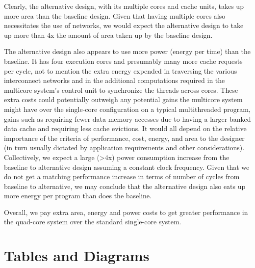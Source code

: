 \documentclass[10pt]{article}
\begin{document}
Clearly, the alternative design, with its multiple cores and cache units, takes up more area than the baseline design. Given that having multiple cores also necessitates the use of networks, we would expect the alternative design to take up more than 4x the amount of area taken up by the baseline design.

The alternative design also appears to use more power (energy per time) than the baseline. It has four execution cores and presumably many more cache requests per cycle, not to mention the extra energy expended in traversing the various interconnect networks and in the additional computations required in the multicore system's control unit to synchronize the threads across cores. These extra costs could potentially outweigh any potential gains the multicore system might have over the single-core configuration on a typical multithreaded program, gains such as requiring fewer data memory accesses due to having a larger banked data cache and requiring less cache evictions. It would all depend on the relative importance of the criteria of performance, cost, energy, and area to the designer (in turn usually dictated by application requirements and other considerations). Collectively, we expect a large (>4x) power consumption increase from the baseline to alternative design assuming a constant clock frequency. Given that we do not get a matching performance increase in terms of number of cycles from baseline to alternative, we may conclude that the alternative design also eats up more energy per program than does the baseline.

Overall, we pay extra area, energy and power costs to get greater performance in the quad-core system over the standard single-core system.



\newpage
\section {Tables and Diagrams}

\end{document}
